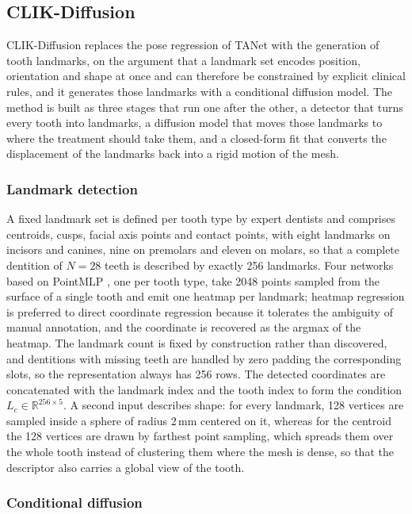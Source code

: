 \documentclass[10pt,a4paper]{article}
\begin{document}
\subsection{CLIK-Diffusion}
\label{sec:clik}

CLIK-Diffusion replaces the pose regression of TANet with the generation of tooth landmarks, on the argument that a landmark set encodes position, orientation and shape at once and can therefore be constrained by explicit clinical rules, and it generates those landmarks with a conditional diffusion model. The method is built as three stages that run one after the other, a detector that turns every tooth into landmarks, a diffusion model that moves those landmarks to where the treatment should take them, and a closed-form fit that converts the displacement of the landmarks back into a rigid motion of the mesh.

\subsubsection{Landmark detection}

A fixed landmark set is defined per tooth type by expert dentists and comprises centroids, cusps, facial axis points and contact points, with eight landmarks on incisors and canines, nine on premolars and eleven on molars, so that a complete dentition of $N = 28$ teeth is described by exactly 256 landmarks. Four networks based on PointMLP \citep{ma2022pointmlp}, one per tooth type, take 2048 points sampled from the surface of a single tooth and emit one heatmap per landmark; heatmap regression is preferred to direct coordinate regression because it tolerates the ambiguity of manual annotation, and the coordinate is recovered as the argmax of the heatmap. The landmark count is fixed by construction rather than discovered, and dentitions with missing teeth are handled by zero padding the corresponding slots, so the representation always has 256 rows. The detected coordinates are concatenated with the landmark index and the tooth index to form the condition $L_c \in \mathbb{R}^{256\times5}$. A second input describes shape: for every landmark, 128 vertices are sampled inside a sphere of radius 2\,mm centered on it, whereas for the centroid the 128 vertices are drawn by farthest point sampling, which spreads them over the whole tooth instead of clustering them where the mesh is dense, so that the descriptor also carries a global view of the tooth.

\subsubsection{Conditional diffusion}
\end{document}
